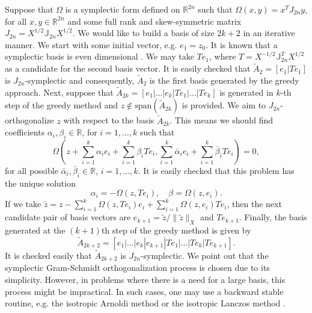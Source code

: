 Suppose that $\Omega$ is a symplectic form defined on $\mathbb R^{2n}$ such that $\Omega(x,y) = x^T J_{2n} y$, for all $x,y\in \mathbb R^{2n}$ and some full rank and skew-symmetric matrix $J_{2n} = X^{1/2} \mathbb J_{2n} X^{1/2}$. We would like to build a basis of size $2k+2$ in an iterative manner. We start with some initial vector, e.g. $e_1 = z_0$. It is known that a symplectic basis is even dimensional \cite{Marsden:2010:IMS:1965128}. We may take $Te_1$, where $T = X^{-1/2} \mathbb J_{2n}^{T}X^{1/2}$ as a candidate for the second basis vector. It is easily checked that $\tilde A_2=[e_1|Te_1]$ is $J_{2n}$-symplectic and consequently, $\tilde A_2$ is the first basis generated by the greedy approach. Next, suppose that $\tilde A_{2k} = [e_1|\dots|e_k|Te_1|\dots|Te_k]$ is generated in $k$-th step of the greedy method and $z\not \in \text{span}\left(\tilde A_{2k}\right)$ is provided. We aim to $J_{2n}$-orthogonalize $z$ with respect to the basis $\tilde A_{2k}$. This means we should find coefficients $\alpha_i,\beta_i\in \mathbb R$, for $i=1,\dots,k$ such that
\begin{equation}
	\Omega\left( z +\sum_{i=1}^{k} \alpha_i e_i +\sum_{i=1}^{k} \beta_i Te_i, \sum_{i=1}^{k}\bar \alpha_i e_i +\sum_{i=1}^{k} \bar \beta_i Te_i \right) = 0,
\end{equation}
for all possible $\bar \alpha_i,\bar \beta_i \in \mathbb R$, $i=1,\dots,k$. It is easily checked that this problem has the unique solution
\begin{equation}
	\alpha_i = - \Omega(z,Te_i), \quad \beta = \Omega(z,e_i).
\end{equation}
If we take $\tilde z = z -\sum_{i=1}^{k} \Omega(z,Te_i) e_i +\sum_{i=1}^{k} \Omega(z,e_i) Te_i$, then the next candidate pair of basis vectors are $e_{k+1} = \tilde z / \| \tilde z \|_X$ and $Te_{k+1}$. Finally, the basis generated at the $(k+1)$th step of the greedy method is given by
\begin{equation}
	\tilde A_{2k+2} = [e_1|\dots|e_k|e_{k+1}|Te_1|\dots|Te_k|Te_{k+1}].
\end{equation}
It is checked easily that $\tilde A_{2k+2}$ is $J_{2n}$-symplectic. We point out that the symplectic Gram-Schmidt orthogonalization process is chosen due to its simplicity. However, in problems where there is a need for a large basis, this process might be impractical. In such cases, one may use a backward stable routine, e.g. the isotropic Arnoldi method or the isotropic Lanczos method \cite{doi:10.1137/S1064827500366434}.


